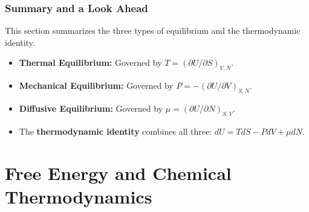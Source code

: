 \documentclass[a4paper,oneside,article]{memoir}
\begin{document}
\subsection{Summary and a Look Ahead}
This section summarizes the three types of equilibrium and the thermodynamic identity.
\begin{itemize}
    \item \textbf{Thermal Equilibrium:} Governed by $T = (\partial U / \partial S)_{V,N}$.
    \item \textbf{Mechanical Equilibrium:} Governed by $P = -(\partial U / \partial V)_{S,N}$.
    \item \textbf{Diffusive Equilibrium:} Governed by $\mu = (\partial U / \partial N)_{S,V}$.
    \item The \textbf{thermodynamic identity} combines all three: $dU = TdS - PdV + \mu dN$.
\end{itemize}

\setcounter{chapter}{4}
\chapter{Free Energy and Chemical Thermodynamics}
\end{document}

